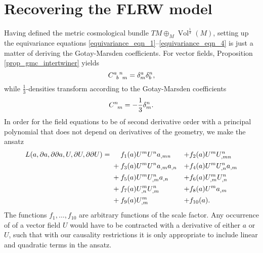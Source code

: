 \section{Recovering the FLRW model}
Having defined the metric cosmological bundle $TM \oplus_M \operatorname{Vol}^{\frac{1}{3}}(M)$, setting up the equivariance equations \eqref{equivariance_eqn_1}--\eqref{equivariance_eqn_4} is just a matter of deriving the Gotay-Marsden coefficients. For vector fields, Proposition \ref{prop_gmc_intertwiner} yields
\begin{equation}
  \gmc{a}{b}{n}{m} = \delta^a_m \delta^n_b,
\end{equation}
while $\frac{1}{3}$-densities transform according to the Gotay-Marsden coefficients
\begin{equation}
  \gmc{}{}{n}{m} = -\frac{1}{3} \delta^n_m.
\end{equation}
In order for the field equations to be of second derivative order with a principal polynomial that does not depend on derivatives of the geometry, we make the ansatz
\begin{equation}
  \begin{aligned}
    L(a,\partial a, \partial\partial a, U, \partial U, \partial\partial U) = {} & \mathbin{\hphantom{+}} f_1(a) U^m U^n a_{,mn} & + & f_2(a) U^m U^n_{,mn} \\
    {} & + f_3(a) U^m U^n a_{,m} a_{,n} & + & f_4(a) U^m U^n_{,n} a_{,m} \\
    {} & + f_5(a) U^m U^n_{,m} a_{,n} & + & f_6(a) U^m_{,m} U^n_{,n} \\
    {} & + f_7(a) U^m_{,n} U^n_{,m} & + & f_8(a) U^m a_{,m} \\
    {} & + f_9(a) U^m_{,m} & + & f_{10}(a).
  \end{aligned}
\end{equation}
The functions $f_1,\dots, f_{10}$ are arbitrary functions of the scale factor. Any occurrence of of a vector field $U$ would have to be contracted with a derivative of either $a$ or $U$, such that with our causality restrictions it is only appropriate to include linear and quadratic terms in the ansatz.

